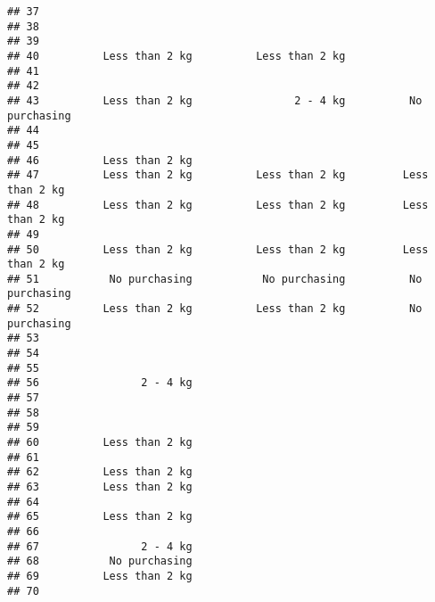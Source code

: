 \documentclass[
]{article}
\begin{document}
\begin{verbatim}
## 37                                                                       
## 38                                                                       
## 39                                                                       
## 40          Less than 2 kg          Less than 2 kg                       
## 41                                                                       
## 42                                                                       
## 43          Less than 2 kg                2 - 4 kg          No purchasing
## 44                                                                       
## 45                                                                       
## 46          Less than 2 kg                                               
## 47          Less than 2 kg          Less than 2 kg         Less than 2 kg
## 48          Less than 2 kg          Less than 2 kg         Less than 2 kg
## 49                                                                       
## 50          Less than 2 kg          Less than 2 kg         Less than 2 kg
## 51           No purchasing           No purchasing          No purchasing
## 52          Less than 2 kg          Less than 2 kg          No purchasing
## 53                                                                       
## 54                                                                       
## 55                                                                       
## 56                2 - 4 kg                                               
## 57                                                                       
## 58                                                                       
## 59                                                                       
## 60          Less than 2 kg                                               
## 61                                                                       
## 62          Less than 2 kg                                               
## 63          Less than 2 kg                                               
## 64                                                                       
## 65          Less than 2 kg                                               
## 66                                                                       
## 67                2 - 4 kg                                               
## 68           No purchasing                                               
## 69          Less than 2 kg                                               
## 70                                                                       

\end{verbatim}
\end{document}
